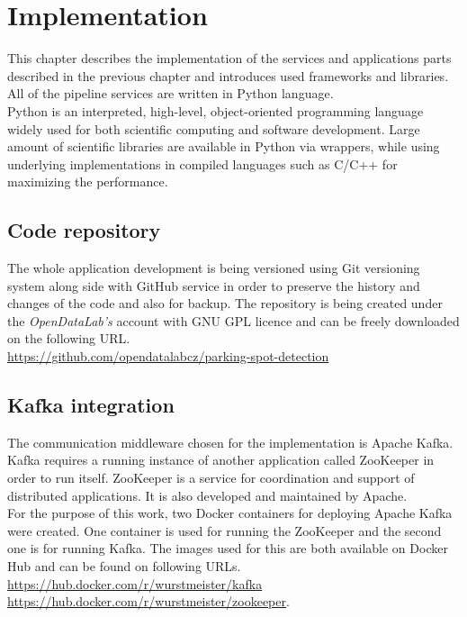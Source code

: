\documentclass[thesis=M,english]{FITthesis}[2019/03/06]
\begin{document}
\chapter{Implementation}
This chapter describes the implementation of the services and applications parts described in the previous chapter and introduces used frameworks and libraries. All of the pipeline services are written in Python language.\\

Python is an interpreted, high-level, object-oriented programming language widely used for both scientific computing and software development. Large amount of scientific libraries are available in Python via wrappers, while using underlying implementations in compiled languages such as C/C++ for maximizing the performance.



\section{Code repository}
The whole application development is being versioned using Git versioning system along side with GitHub service in order to preserve the history and changes of the code and also for backup. The repository is being created under the \textit{OpenDataLab's} account with GNU GPL licence and can be freely downloaded on the following URL.\\

\url{https://github.com/opendatalabcz/parking-spot-detection}

\section{Kafka integration}
The communication middleware chosen for the implementation is Apache Kafka. Kafka requires a running instance of another application called ZooKeeper in order to run itself. ZooKeeper is a service for coordination and support of distributed applications. It is also developed and maintained by Apache.\\

For the purpose of this work, two Docker containers for deploying Apache Kafka were created. One container is used for running the ZooKeeper and the second one is for running Kafka. The images used for this are both available on Docker Hub and can be found on following URLs. \\

\url{https://hub.docker.com/r/wurstmeister/kafka}\\
\url{https://hub.docker.com/r/wurstmeister/zookeeper}.\\
\end{document}

